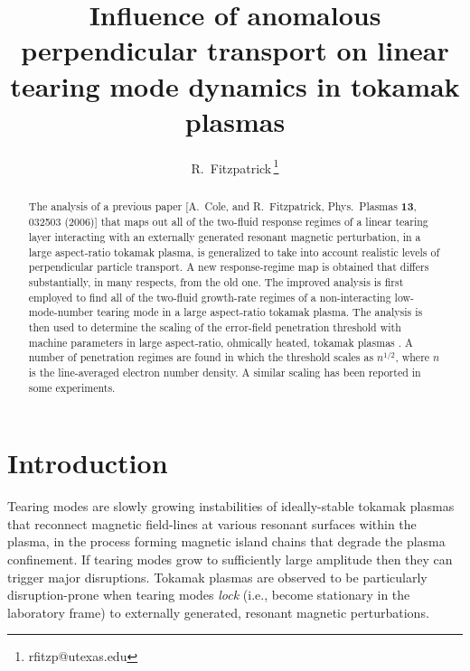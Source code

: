 \documentclass[12pt,prb,aps]{revtex4-1}
\begin{document}
\title{Influence of anomalous perpendicular transport on linear tearing mode dynamics in tokamak plasmas}

\author{R.~Fitzpatrick\,\footnote{rfitzp@utexas.edu}}

\begin{abstract}
The analysis of a previous paper [A.~Cole, and R.~Fitzpatrick, Phys.\ Plasmas {\bf 13}, 032503 (2006)] that maps out all of the
two-fluid response regimes of a  linear tearing layer interacting with an externally generated resonant magnetic perturbation, in a large aspect-ratio tokamak plasma,  is generalized to
take into account realistic levels of perpendicular particle transport. A new response-regime map is obtained that differs substantially, in many
respects, from the old one. The improved analysis is first employed to find all of the two-fluid growth-rate regimes of a non-interacting low-mode-number tearing mode in a large aspect-ratio tokamak plasma. 
The analysis is then used to determine the scaling of the error-field penetration threshold with machine
parameters in large aspect-ratio, ohmically heated, tokamak plasmas . A number of penetration regimes are found in which the threshold scales as $n^{1/2}$, where $n$ is the line-averaged
electron number density. A similar scaling has been reported in some experiments. 
\end{abstract}

\maketitle

\section{Introduction}
Tearing modes are slowly growing instabilities of ideally-stable tokamak plasmas that reconnect magnetic field-lines
at various resonant surfaces within the plasma, in the process forming magnetic island chains that degrade the plasma confinement.\cite{wes}
If tearing modes grow to sufficiently large amplitude then they can trigger major disruptions.\cite{wes1}  Tokamak
plasmas are observed to be particularly disruption-prone when tearing modes {\em lock}\/ (i.e., become stationary in the
laboratory frame) to externally generated, resonant magnetic perturbations.\cite{vries}  
\end{document}
